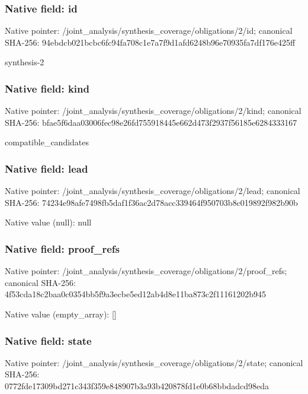 \documentclass[10pt,a4paper]{article}
\begin{document}
\subsubsection{Native field: id}
Native pointer: /joint\_\allowbreak{}analysis/synthesis\_\allowbreak{}coverage/obligations/2/id; canonical SHA-256: 94ebdcb021bcbc6fc94fa708c1e7a7f9d1afd6248b96e70935fa7df176e425ff

\begingroup\raggedright\sloppy synthesis-2\par\endgroup

\subsubsection{Native field: kind}
Native pointer: /joint\_\allowbreak{}analysis/synthesis\_\allowbreak{}coverage/obligations/2/kind; canonical SHA-256: bfae5f6daa03006fec98e26fd755918445e662d473f2937f56185e6284333167

\begingroup\raggedright\sloppy compatible\_\allowbreak{}candidates\par\endgroup

\subsubsection{Native field: lead}
Native pointer: /joint\_\allowbreak{}analysis/synthesis\_\allowbreak{}coverage/obligations/2/lead; canonical SHA-256: 74234e98afe7498fb5daf1f36ac2d78acc339464f950703b8c019892f982b90b

Native value (null): null

\subsubsection{Native field: proof\_\allowbreak{}refs}
Native pointer: /joint\_\allowbreak{}analysis/synthesis\_\allowbreak{}coverage/obligations/2/proof\_\allowbreak{}refs; canonical SHA-256: 4f53cda18c2baa0c0354bb5f9a3ecbe5ed12ab4d8e11ba873c2f11161202b945

Native value (empty\_\allowbreak{}array): []

\subsubsection{Native field: state}
Native pointer: /joint\_\allowbreak{}analysis/synthesis\_\allowbreak{}coverage/obligations/2/state; canonical SHA-256: 0772fde17309bd271c343f359e848907b3a93b420878fd1e0b68bbdadcd98eda
\end{document}
